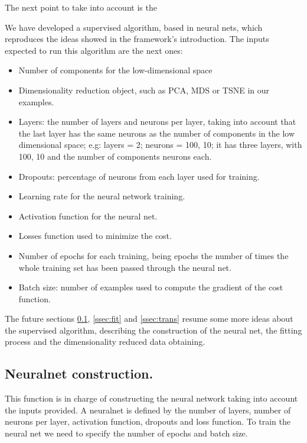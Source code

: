 \documentclass[a4paper,11pt,spanish]{report}
\begin{document}
The next point to take into account is the 

\newpage
We have developed a supervised algorithm, based in neural nets, which reproduces the ideas showed in the framework's introduction.
The inputs expected to run this algorithm are the next ones:

\begin{itemize}
\item Number of components for the low-dimensional space
\item Dimensionality reduction object, such as PCA, MDS or TSNE in our examples.
\item Layers: the number of layers and neurons per layer, taking into account that the last layer has the same neurons as the number of components in the low dimensional space; e.g: layers = 2; neurons = 100, 10; it has three layers, with 100, 10 and the number of components neurons each.
\item Dropouts: percentage of neurons from each layer used for training.
\item Learning rate for the neural network training.
\item Activation function for the neural net.
\item Losses function used to minimize the cost.
\item Number of epochs for each training, being epochs the number of times the whole training set has been passed through the neural net.
\item Batch size: number of examples used to compute the gradient of the cost function.
\end{itemize}

The future sections \ref{ssec:nnc}, \ref{ssec:fit} and \ref{ssec:trans} resume some more ideas about the supervised algorithm, describing the construction of the neural net, the fitting process and the dimensionality reduced data obtaining.

\subsection{Neuralnet construction.}
\label{ssec:nnc}

This function is in charge of constructing the neural network taking into account the inputs provided. A neuralnet is defined by the number of layers, number of neurons per layer, activation function, dropouts and loss function. To train the neural net we need to specify the number of epochs and batch size.
\end{document}
